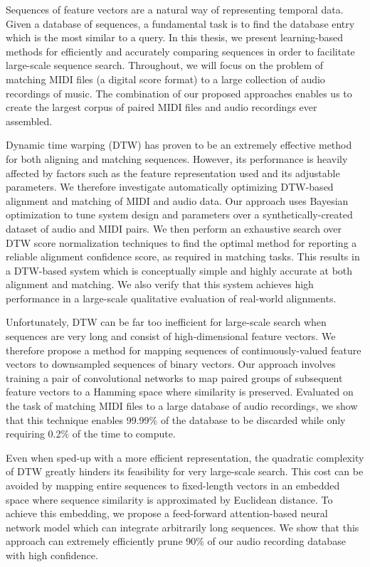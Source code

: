 Sequences of feature vectors are a natural way of representing temporal data.
Given a database of sequences, a fundamental task is to find the database entry which is the most similar to a query.
In this thesis, we present learning-based methods for efficiently and accurately comparing sequences in order to facilitate large-scale sequence search.
Throughout, we will focus on the problem of matching MIDI files (a digital score format) to a large collection of audio recordings of music.
The combination of our proposed approaches enables us to create the largest corpus of paired MIDI files and audio recordings ever assembled.

Dynamic time warping (DTW) has proven to be an extremely effective method for both aligning and matching sequences.
However, its performance is heavily affected by factors such as the feature representation used and its adjustable parameters.
We therefore investigate automatically optimizing DTW-based alignment and matching of MIDI and audio data.
Our approach uses Bayesian optimization to tune system design and parameters over a synthetically-created dataset of audio and MIDI pairs.
We then perform an exhaustive search over DTW score normalization techniques to find the optimal method for reporting a reliable alignment confidence score, as required in matching tasks.
This results in a DTW-based system which is conceptually simple and highly accurate at both alignment and matching.
We also verify that this system achieves high performance in a large-scale qualitative evaluation of real-world alignments.

Unfortunately, DTW can be far too inefficient for large-scale search when sequences are very long and consist of high-dimensional feature vectors.
We therefore propose a method for mapping sequences of continuously-valued feature vectors to downsampled sequences of binary vectors.
Our approach involves training a pair of convolutional networks to map paired groups of subsequent feature vectors to a Hamming space where similarity is preserved.
Evaluated on the task of matching MIDI files to a large database of audio recordings, we show that this technique enables 99.99\% of the database to be discarded while only requiring 0.2\% of the time to compute.

Even when sped-up with a more efficient representation, the quadratic complexity of DTW greatly hinders its feasibility for very large-scale search.
This cost can be avoided by mapping entire sequences to fixed-length vectors in an embedded space where sequence similarity is approximated by Euclidean distance.
To achieve this embedding, we propose a feed-forward attention-based neural network model which can integrate arbitrarily long sequences.
We show that this approach can extremely efficiently prune 90\% of our audio recording database with high confidence.

